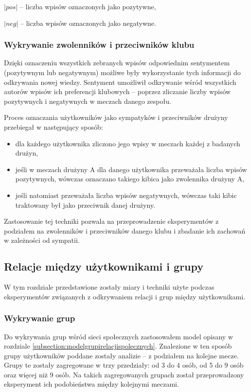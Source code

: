 $|pos|$ -- liczba wpisów oznaczonych jako pozytywne,

$|neg|$ -- liczba wpisów oznaczonych jako negatywne.



\subsubsection{Wykrywanie zwolenników i przeciwników klubu}
\label{subsubsection:wykrywaniezwolennikow}

Dzięki oznaczeniu wszystkich zebranych wpisów odpowiednim sentymentem
(pozytywnym lub negatywnym) możliwe były wykorzystanie tych informacji do
odkrywania nowej wiedzy. Sentyment umożliwił odkrywanie wśród wszystkich
autorów wpisów ich preferencji klubowych -- poprzez zliczanie liczby wpisów
pozytywnych i negatywnych w meczach danego zespołu.

Proces oznaczania użytkowników jako sympatyków i przeciwników drużyny przebiegał
w następujący sposób:
\begin{itemize}
  \item dla każdego użytkownika zliczono jego wpisy w meczach każdej z badanych 
  drużyn,
  \item jeśli w meczach drużyny A dla danego użytkownika przeważała liczba 
  wpisów pozytywnych, wówczas oznaczano takiego kibica jako zwolennika drużyny A,
  \item jeśli natomiast przeważała liczba wpisów negatywnych, wówczas taki kibic
  traktowany był jako przeciwnik danej drużyny.  
\end{itemize} 

Zastosowanie tej techniki pozwala na przeprowadzenie eksperymentów z podziałem
na zwolenników i przeciwników danego klubu i zbadanie ich zachowań w zależności
od sympatii.




\subsection{Relacje między użytkownikami i grupy}
\label{subsection:miary-relacje}
W tym rozdziale przedstawione zostały miary i techniki użyte podczas
eksperymentów związanych z odkrywaniem relacji i grup między użytkownikami.

\subsubsection{Wykrywanie grup}
\label{subsubsection:koncepcja-wykrywaniegrup}
Do wykrywania grup wśród sieci społecznych zastosowałem model opisany w
rozdziale \ref{subsection:modelgrupirelacjispolecznych}. Znalezione w ten sposób grupy
użytkowników poddane zostały analizie -- z podziałem na kolejne mecze.
Grupy te zostały zagregowane w trzy przedziały: od 3 do 4 osób, od 5 do 9 osób
oraz więcej niż 9 osób. Na takich zagregowanych grupach został przeprowadzony
eksperyment ich podobieństwa między kolejnymi meczami.

